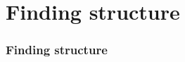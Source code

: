 \documentclass{beamer}
\begin{document}
\section{Finding structure}

\begin{frame}
\frametitle{Finding structure}
\end{frame}
\end{document}
